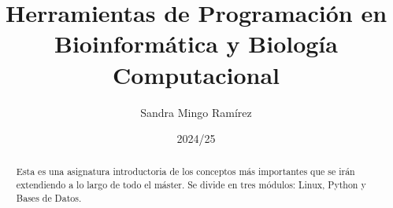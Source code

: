 \documentclass{config/apuntes}
\title{Herramientas de Programación en Bioinformática y Biología Computacional}
\author{Sandra Mingo Ramírez}
\date{2024/25}
\begin{document}
\begin{abstract}
Esta es una asignatura introductoria de los conceptos más importantes que se irán extendiendo a lo largo de todo el máster. Se divide en tres módulos: Linux, Python y Bases de Datos. 
\end{abstract}

\pagestyle{plain}

\maketitle

\tableofcontents



\end{document}
